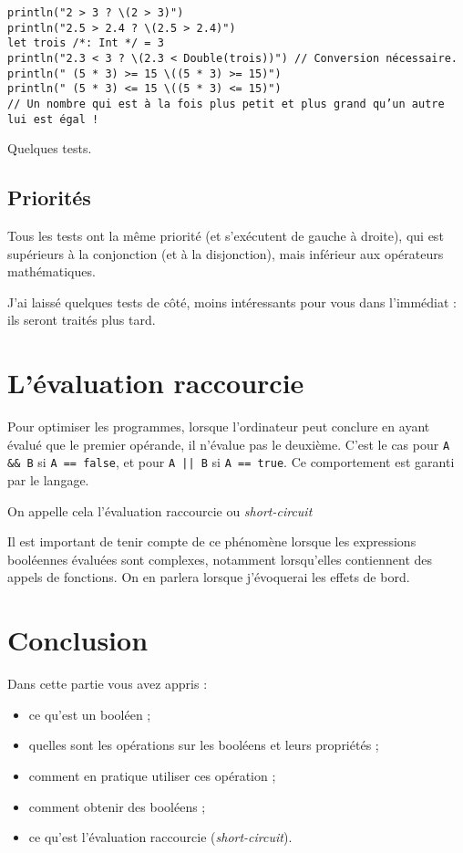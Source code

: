 \begin{listing}[h]
\begin{verbatim}
println("2 > 3 ? \(2 > 3)")
println("2.5 > 2.4 ? \(2.5 > 2.4)")
let trois /*: Int */ = 3
println("2.3 < 3 ? \(2.3 < Double(trois))") // Conversion nécessaire.
println(" (5 * 3) >= 15 \((5 * 3) >= 15)")
println(" (5 * 3) <= 15 \((5 * 3) <= 15)")
// Un nombre qui est à la fois plus petit et plus grand qu’un autre lui est égal !

\end{verbatim}
\caption{Quelques tests.}
\end{listing}%
\subsection{Priorités}
Tous les tests ont la même priorité
(et s'exécutent de gauche à droite),
qui est supérieurs à la conjonction (et à la disjonction),
mais inférieur aux opérateurs mathématiques.



J'ai laissé quelques tests de côté, moins intéressants pour vous dans l'immédiat : ils seront traités plus tard.
\section{L'évaluation raccourcie}
Pour optimiser les programmes, lorsque l'ordinateur peut conclure en ayant évalué que le premier opérande, il n'évalue pas le deuxième. C'est le cas pour \texttt{A && B} si \texttt{A == false},
et pour \texttt{A || B} si \texttt{A == true}.
Ce comportement est garanti par le langage.

On appelle cela l'évaluation raccourcie ou \emph{short-circuit}

Il est important de tenir compte de ce phénomène lorsque les expressions booléennes évaluées sont complexes, notamment lorsqu'elles contiennent des appels de fonctions. On en parlera lorsque j'évoquerai les effets de bord.

\section*{Conclusion}
{}
Dans cette partie vous avez appris :
\begin{itemize}
\item ce qu'est un booléen ;
\item quelles sont les opérations sur les booléens et leurs propriétés ;
\item comment en pratique utiliser ces opération ;
\item comment obtenir des booléens ;
\item ce qu'est l'évaluation raccourcie (\emph{short-circuit}).
\end{itemize}
